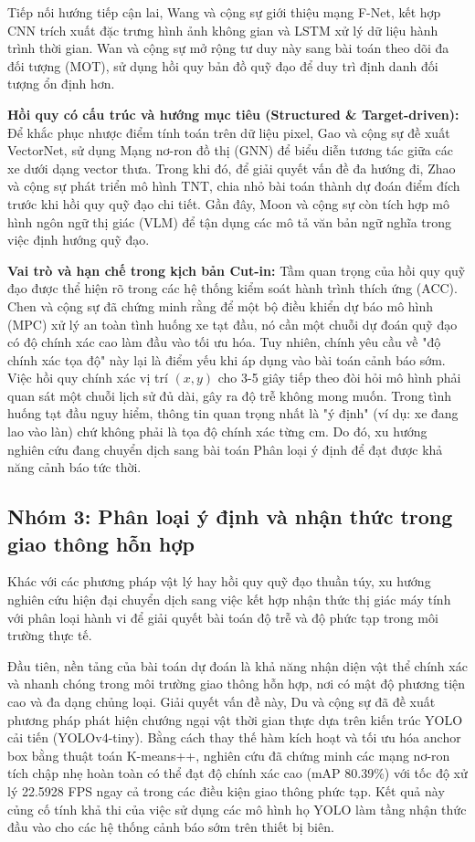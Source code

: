 	Tiếp nối hướng tiếp cận lai, Wang và cộng sự \cite{Wang2021} giới thiệu mạng F-Net, kết hợp CNN trích xuất đặc trưng hình ảnh không gian và LSTM xử lý dữ liệu hành trình thời gian. Wan và cộng sự \cite{Wan2021} mở rộng tư duy này sang bài toán theo dõi đa đối tượng (MOT), sử dụng hồi quy bản đồ quỹ đạo để duy trì định danh đối tượng ổn định hơn.

	\textbf{Hồi quy có cấu trúc và hướng mục tiêu (Structured \& Target-driven):}
	Để khắc phục nhược điểm tính toán trên dữ liệu pixel, Gao và cộng sự \cite{VectorNet2020} đề xuất VectorNet, sử dụng Mạng nơ-ron đồ thị (GNN) để biểu diễn tương tác giữa các xe dưới dạng vector thưa. Trong khi đó, để giải quyết vấn đề đa hướng đi, Zhao và cộng sự \cite{TNT2020} phát triển mô hình TNT, chia nhỏ bài toán thành dự đoán điểm đích trước khi hồi quy quỹ đạo chi tiết. Gần đây, Moon và cộng sự \cite{VisionTrap2024} còn tích hợp mô hình ngôn ngữ thị giác (VLM) để tận dụng các mô tả văn bản ngữ nghĩa trong việc định hướng quỹ đạo.

	\textbf{Vai trò và hạn chế trong kịch bản Cut-in:}
	Tầm quan trọng của hồi quy quỹ đạo được thể hiện rõ trong các hệ thống kiểm soát hành trình thích ứng (ACC). Chen và cộng sự \cite{Chen2021} đã chứng minh rằng để một bộ điều khiển dự báo mô hình (MPC) xử lý an toàn tình huống xe tạt đầu, nó cần một chuỗi dự đoán quỹ đạo có độ chính xác cao làm đầu vào tối ưu hóa.
	Tuy nhiên, chính yêu cầu về "độ chính xác tọa độ" này lại là điểm yếu khi áp dụng vào bài toán cảnh báo sớm. Việc hồi quy chính xác vị trí $(x, y)$ cho 3-5 giây tiếp theo đòi hỏi mô hình phải quan sát một chuỗi lịch sử đủ dài, gây ra độ trễ không mong muốn. Trong tình huống tạt đầu nguy hiểm, thông tin quan trọng nhất là "ý định" (ví dụ: xe đang lao vào làn) chứ không phải là tọa độ chính xác từng cm. Do đó, xu hướng nghiên cứu đang chuyển dịch sang bài toán Phân loại ý định để đạt được khả năng cảnh báo tức thời.

	\subsection{Nhóm 3: Phân loại ý định và nhận thức trong giao thông hỗn hợp}
	Khác với các phương pháp vật lý hay hồi quy quỹ đạo thuần túy, xu hướng nghiên cứu hiện đại chuyển dịch sang việc kết hợp nhận thức thị giác máy tính với phân loại hành vi để giải quyết bài toán độ trễ và độ phức tạp trong môi trường thực tế.
	
	Đầu tiên, nền tảng của bài toán dự đoán là khả năng nhận diện vật thể chính xác và nhanh chóng trong môi trường giao thông hỗn hợp, nơi có mật độ phương tiện cao và đa dạng chủng loại. Giải quyết vấn đề này, Du và cộng sự \cite{Du2022ImprovedRT} đã đề xuất phương pháp phát hiện chướng ngại vật thời gian thực dựa trên kiến trúc YOLO cải tiến (YOLOv4-tiny). Bằng cách thay thế hàm kích hoạt và tối ưu hóa anchor box bằng thuật toán K-means++, nghiên cứu đã chứng minh các mạng nơ-ron tích chập nhẹ hoàn toàn có thể đạt độ chính xác cao (mAP 80.39\%) với tốc độ xử lý 22.5928 FPS ngay cả trong các điều kiện giao thông phức tạp. Kết quả này củng cố tính khả thi của việc sử dụng các mô hình họ YOLO làm tầng nhận thức đầu vào cho các hệ thống cảnh báo sớm trên thiết bị biên.
	
